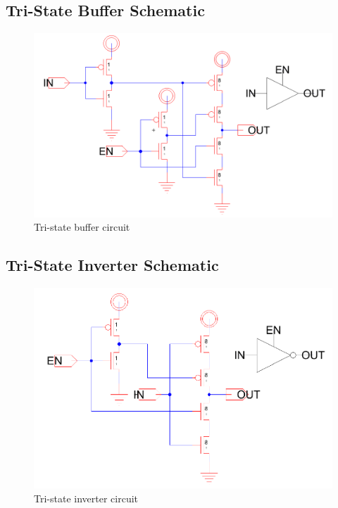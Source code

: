 \documentclass[12pt]{report}
\begin{document}
\subsection*{Tri-State Buffer Schematic}
\begin{figure}[H]
  \centering
    \includegraphics[width=1.0\textwidth]{tristate_buffer_circuit.PNG}
  \caption{Tri-state buffer circuit}
  \label{fig:tristate_buffer_circuit}
\end{figure}

\subsection*{Tri-State Inverter Schematic}
\begin{figure}[H]
  \centering
    \includegraphics[width=1.0\textwidth]{tristate_inverter_circuit.PNG}
  \caption{Tri-state inverter circuit}
  \label{fig:tristate_inverter_circuit}
\end{figure}
\end{document}
